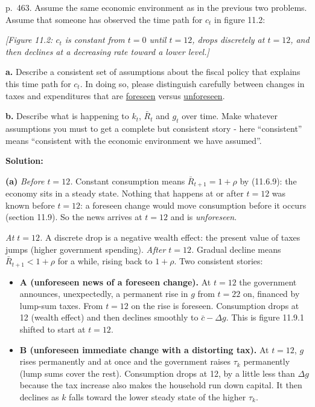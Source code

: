 \documentclass[12pt, letterpaper]{article}
\newcommand{\Rb}{\bar R}
\newcommand{\cb}{\bar c}
\begin{document}
\begin{tcolorbox}[evenbox,title={Exercise 11.12 \quad Flat, then a drop, then a decline}]
\begin{tcolorbox}[questionbox]
p.~463. Assume the same economic environment as in the previous two problems. Assume that someone has observed the time
path for $c_t$ in figure 11.2:

\smallskip
\emph{[Figure 11.2: $c_t$ is constant from $t=0$ until $t=12$, drops discretely at $t=12$, and then declines at a
decreasing rate toward a lower level.]}

\textbf{a.} Describe a consistent set of assumptions about the fiscal policy that explains this time path for $c_t$. In
doing so, please distinguish carefully between changes in taxes and expenditures that are \underline{foreseen} versus
\underline{unforeseen}.

\textbf{b.} Describe what is happening to $k_t$, $\bar R_t$ and $g_t$ over time. Make whatever assumptions you must to get
a complete but consistent story - here ``consistent'' means ``consistent with the economic environment we have
assumed''.
\end{tcolorbox}

\textbf{Solution:}

\textbf{(a)} \emph{Before $t=12$.} Constant consumption means $\Rb_{t+1}=1+\rho$ by (11.6.9): the economy sits in a
steady state. Nothing that happens at or after $t=12$ was known before $t=12$: a foreseen change would move consumption
before it occurs (section 11.9). So the news arrives at $t=12$ and is \emph{unforeseen}.

\emph{At $t=12$.} A discrete drop is a negative wealth effect: the present value of taxes jumps (higher government
spending). \emph{After $t=12$.} Gradual decline means $\Rb_{t+1}<1+\rho$ for a while, rising back to $1+\rho$.
Two consistent stories:
\begin{itemize}[itemsep=2pt]
\item \textbf{A (unforeseen news of a foreseen change).} At $t=12$ the government announces, unexpectedly, a permanent rise
in $g$ from $t=22$ on, financed by lump-sum taxes. From $t=12$ on the rise is foreseen. Consumption drops at 12 (wealth
effect) and then declines smoothly to $\cb-\Delta g$. This is figure 11.9.1 shifted to start at $t=12$.
\item \textbf{B (unforeseen immediate change with a distorting tax).} At $t=12$, $g$ rises permanently and at once and the
government raises $\tau_k$ permanently (lump sums cover the rest). Consumption drops at 12, by a little less than
$\Delta g$ because the tax increase also makes the household run down capital. It then declines as $k$ falls toward the
lower steady state of the higher $\tau_k$.
\end{itemize}


\end{tcolorbox}
\end{document}
